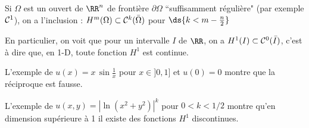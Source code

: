%
\begin{theorem}
  Si $\Omega$ est un ouvert de $\RR^n$ de fronti\`ere $\partial\Omega$
  ``suffisamment r\'eguli\`ere" (par exemple ${\cal C}^1$), on a l'inclusion :
  $H^m(\Omega) \subset {\cal C}^k(\bar{\Omega})$ pour $\ds{ k < m-\frac{n}{2}
  }$\label{thr:9}
\end{theorem}

%
\begin{example}
  En particulier, on voit que pour un intervalle $I$ de $\RR$, on a $H^1(I)
  \subset {\cal C}^0(\bar{I})$, c'est \`a dire que, en 1-D, toute fonction
  $H^1$ est continue.

  L'exemple de $u(x) = x\, \sin\frac{1}{x}$ pour $x\in]0,1]$ et $u(0)=0$
  montre que la r\'eciproque est fausse.

  L'exemple de $u(x,y) = | \ln (x^2+y^2) |^k$ pour $0<k<1/2$ montre qu'en
  dimension sup\'erieure \`a 1 il existe des fonctions $H^1$ discontinues.
\end{example}

%
%
